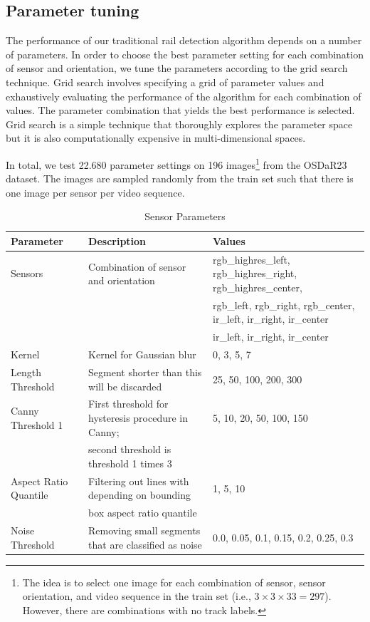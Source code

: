 \documentclass[Master,MDS,english]{BASE/twbook} %
\begin{document}
\subsection{Parameter tuning} \label{sec:fld_parameter}

The performance of our traditional rail detection algorithm depends on a number of parameters. In order to choose the best parameter setting for each combination of sensor and orientation, we tune the parameters according to the grid search technique. Grid search involves specifying a grid of parameter values and exhaustively evaluating the performance of the algorithm for each combination of values. The parameter combination that yields the best performance is selected. Grid search is a simple technique that thoroughly   explores the parameter space but it is also computationally expensive in multi-dimensional spaces.

In total, we test 22.680 parameter settings on 196 images\footnote{The idea is to select one image for each combination of sensor, sensor orientation, and video sequence in the train set (i.e., $3\times3\times33 = 297$). However, there are combinations with no track labels.} from the OSDaR23 dataset. The images are sampled randomly from the train set such that there is one image per sensor per video sequence. 
 
\begin{table}[htbp]
    \centering
    \tiny
    \caption{Sensor Parameters}
    \label{tab:sensor_parameters_fld}
    \begin{tabular}{|l|l|l|}
        \hline
        \textbf{Parameter} & \textbf{Description} & \textbf{Values} \\
        \hline
        Sensors & Combination of sensor and orientation & rgb\_highres\_left, rgb\_highres\_right, rgb\_highres\_center,  \\
                & & rgb\_left, rgb\_right, rgb\_center, ir\_left, ir\_right, ir\_center \\
                 & &  ir\_left, ir\_right, ir\_center \\
        \hline
        Kernel & Kernel for Gaussian blur & 0, 3, 5, 7 \\
        \hline
        Length Threshold & Segment shorter than this will be discarded & 25, 50, 100, 200, 300 \\
        \hline
        Canny Threshold 1 & First threshold for hysteresis procedure in Canny;  & 5, 10, 20, 50, 100, 150 \\
         & second threshold is threshold 1 times 3 &  \\
        \hline
        Aspect Ratio Quantile & Filtering out lines with depending on bounding  & 1, 5, 10 \\
          &  box aspect ratio quantile &  \\
        \hline
        Noise Threshold & Removing small segments that are classified as noise & 0.0, 0.05, 0.1, 0.15, 0.2, 0.25, 0.3 \\
        \hline
    \end{tabular}
\end{table}
\end{document}
